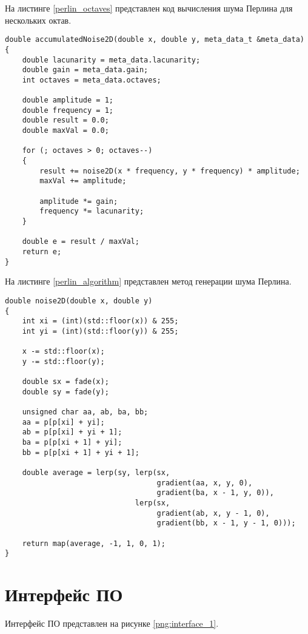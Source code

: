 На листинге \ref{perlin_octaves} представлен код вычисления шума Перлина для нескольких октав.
\begin{lstlisting}[label=perlin_octaves,caption=Программный код вычисления шума Перлина для нескольких октав.]
double accumulatedNoise2D(double x, double y, meta_data_t &meta_data)
{
	double lacunarity = meta_data.lacunarity;
	double gain = meta_data.gain;
	int octaves = meta_data.octaves;
	
	double amplitude = 1;
	double frequency = 1;
	double result = 0.0;
	double maxVal = 0.0;
	
	for (; octaves > 0; octaves--)
	{
		result += noise2D(x * frequency, y * frequency) * amplitude;
		maxVal += amplitude;
		
		amplitude *= gain;
		frequency *= lacunarity;
	}
	
	double e = result / maxVal;
	return e;
}
\end{lstlisting}

На листинге \ref{perlin_algorithm} представлен метод генерации шума Перлина.
\newpage
\begin{lstlisting}[label=perlin_algorithm,caption=Программный код генерации шума Перлина.]
double noise2D(double x, double y)
{
	int xi = (int)(std::floor(x)) & 255;
	int yi = (int)(std::floor(y)) & 255;
	
	x -= std::floor(x);
	y -= std::floor(y);
	
	double sx = fade(x);
	double sy = fade(y);
	
	unsigned char aa, ab, ba, bb;
	aa = p[p[xi] + yi];
	ab = p[p[xi] + yi + 1];
	ba = p[p[xi + 1] + yi];
	bb = p[p[xi + 1] + yi + 1];

	double average = lerp(sy, lerp(sx,
								   gradient(aa, x, y, 0),
								   gradient(ba, x - 1, y, 0)),
							  lerp(sx,
								   gradient(ab, x, y - 1, 0),
								   gradient(bb, x - 1, y - 1, 0)));
	
	return map(average, -1, 1, 0, 1);
}
\end{lstlisting}

\section{Интерфейс ПО}
Интерфейс ПО представлен на рисунке \ref{png:interface_1}.
\begin{figure}[H]
\end{figure}

